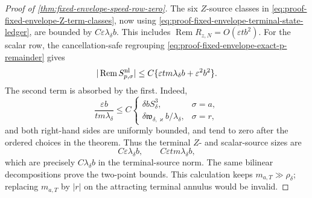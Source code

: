 \begin{proof}[Proof of
\cref{thm:fixed-envelope-speed-row-zero}]
The six \(Z\)-source classes in
\cref{eq:proof-fixed-envelope-Z-term-classes}, now using
\cref{eq:proof-fixed-envelope-terminal-state-ledger}, are bounded by
\(C\varepsilon\lambda_\delta b\).  This includes
\(\operatorname{Rem}R_{z,N}=O(\varepsilon tb^2)\).  For the scalar row,
the cancellation-safe regrouping
\cref{eq:proof-fixed-envelope-exact-p-remainder} gives
\begin{equation}
 |\operatorname{Rem}S_{p,\sigma}^{\rm nl}|
 \le C\{\varepsilon tm\lambda_\delta b
              +\varepsilon^2b^2\}.              \label{eq:proof-fixed-envelope-terminal-p-ledger}
\end{equation}
The second term is absorbed by the first.  Indeed,
\begin{equation}
 \frac{\varepsilon b}{tm\lambda_\delta}
 \le C
 \begin{cases}
  \delta bS_\delta^3,&\sigma=a,\\
  \delta\mathfrak w_{\delta,\varkappa}
       b/\lambda_\delta,&\sigma=r,
 \end{cases}                                     \label{eq:proof-fixed-envelope-terminal-closing-ratios}
\end{equation}
and both right-hand sides are uniformly bounded, and tend to zero after
the ordered choices in the theorem.  Thus the terminal \(Z\)- and
scalar-source sizes are
\[
 C\varepsilon\lambda_\delta b,\qquad
 C\varepsilon tm\lambda_\delta b,
\]
which are precisely \(C\lambda_\delta b\) in the terminal-source norm.
The same bilinear decompositions prove the two-point bounds.  This
calculation keeps \(m_{a,T}\gg\rho_\delta\); replacing \(m_{a,T}\) by
\(|r|\) on the attracting terminal annulus would be invalid.


\end{proof}
